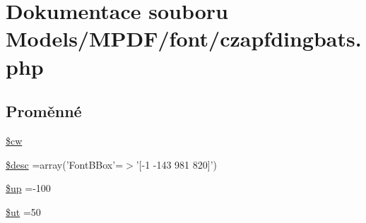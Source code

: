 \hypertarget{czapfdingbats_8php}{\section{Dokumentace souboru Models/\-M\-P\-D\-F/font/czapfdingbats.php}
\label{czapfdingbats_8php}
}
\subsection*{Proměnné}
\begin{DoxyCompactItemize}
\item 
\hyperlink{czapfdingbats_8php_ac2951b03dbb0317e6c61ec920b7479dc}{\$cw}
\item 
\hyperlink{czapfdingbats_8php_a31059b9e4d0c5af34df20da32232ea9a}{\$desc} =array('Font\-B\-Box'=$>$'\mbox{[}-\/1 -\/143 981 820\mbox{]}')
\item 
\hyperlink{czapfdingbats_8php_a6b5ad2ac55f9df46e8f34e78fbd6f176}{\$up} =-\/100
\item 
\hyperlink{czapfdingbats_8php_aadd3f841051043ee58e587e840e8dd0b}{\$ut} =50
\end{DoxyCompactItemize}


